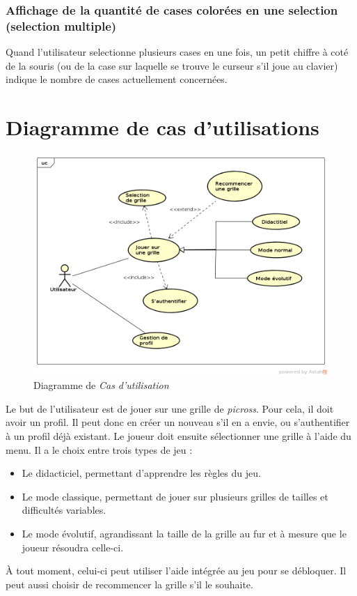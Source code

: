 \documentclass{report}
\begin{document}
		\subsubsection{Affichage de la quantité de cases colorées en une selection (selection multiple)}
			Quand l'utilisateur selectionne plusieurs cases en une fois, un petit chiffre à coté de la souris (ou de la case sur laquelle se trouve le curseur s'il joue au clavier) indique le nombre de cases actuellement concernées.
		
   \section{Diagramme de cas d'utilisations}
      
    \begin{figure}[H]
	\caption{Diagramme de \textit{Cas d’utilisation}}
	\includegraphics[width=17cm]{../UML/UseCase_diagram/UseCase1.png}
    \end{figure}
    

	Le but de l'utilisateur est de jouer sur une grille de \textit{picross}.
Pour cela, il doit avoir un profil. Il peut donc en créer un nouveau s'il en a envie, ou s'authentifier à un profil déjà existant.
	Le joueur doit ensuite sélectionner une grille à l'aide du menu. Il a le choix entre trois types de jeu :
	\begin{itemize}
	\item Le didacticiel, permettant d'apprendre les règles du jeu. 
	\item Le mode classique, permettant de jouer sur plusieurs grilles de tailles et difficultés variables.
	\item Le mode évolutif, agrandissant la taille de la grille au fur et à mesure que le joueur résoudra celle-ci.
	\end{itemize}
	À tout moment, celui-ci peut utiliser l'aide intégrée au jeu pour se débloquer. Il peut aussi choisir de recommencer la grille s'il le souhaite.
\end{document}
